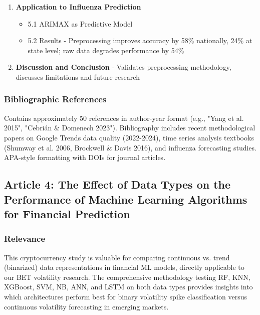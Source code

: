 \documentclass[12pt,a4paper]{article}
\begin{document}
\begin{enumerate}
\begin{itemize}
    \end{itemize}
    \item \textbf{Application to Influenza Prediction}
    \begin{itemize}
        \item 5.1 ARIMAX as Predictive Model
        \item 5.2 Results - Preprocessing improves accuracy by 58\% nationally, 24\% at state level; raw data degrades performance by 54\%
    \end{itemize}
    \item \textbf{Discussion and Conclusion} - Validates preprocessing methodology, discusses limitations and future research
\end{enumerate}

\subsubsection{Bibliographic References}
Contains approximately 50 references in author-year format (e.g., "Yang et al. 2015", "Cebrián \& Domenech 2023"). Bibliography includes recent methodological papers on Google Trends data quality (2022-2024), time series analysis textbooks (Shumway et al. 2006, Brockwell \& Davis 2016), and influenza forecasting studies. APA-style formatting with DOIs for journal articles.

\subsection{Article 4: The Effect of Data Types on the Performance of Machine Learning Algorithms for Financial Prediction}

\subsubsection{Relevance}
This cryptocurrency study is valuable for comparing continuous vs. trend (binarized) data representations in financial ML models, directly applicable to our BET volatility research. The comprehensive methodology testing RF, KNN, XGBoost, SVM, NB, ANN, and LSTM on both data types provides insights into which architectures perform best for binary volatility spike classification versus continuous volatility forecasting in emerging markets.
\end{document}
